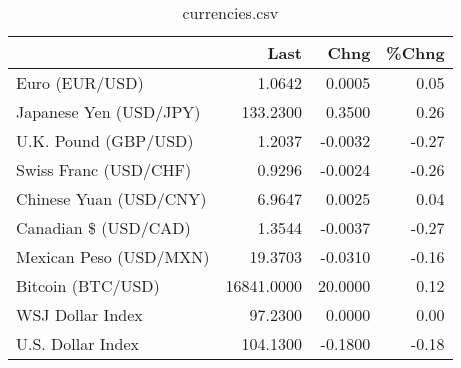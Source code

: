 \documentclass{article}%
\begin{document}
%


\begin{table}[htbp]%
\caption{currencies.csv}%
\centering%
\begin{adjustbox}{width=1\textwidth}%
\begin{tabular}{lrrr}
\toprule
                       &       Last &    Chng &  \%Chng \\
\midrule
        Euro (EUR/USD) &     1.0642 &  0.0005 &   0.05 \\
Japanese Yen (USD/JPY) &   133.2300 &  0.3500 &   0.26 \\
  U.K. Pound (GBP/USD) &     1.2037 & -0.0032 &  -0.27 \\
 Swiss Franc (USD/CHF) &     0.9296 & -0.0024 &  -0.26 \\
Chinese Yuan (USD/CNY) &     6.9647 &  0.0025 &   0.04 \\
  Canadian \$ (USD/CAD) &     1.3544 & -0.0037 &  -0.27 \\
Mexican Peso (USD/MXN) &    19.3703 & -0.0310 &  -0.16 \\
     Bitcoin (BTC/USD) & 16841.0000 & 20.0000 &   0.12 \\
      WSJ Dollar Index &    97.2300 &  0.0000 &   0.00 \\
     U.S. Dollar Index &   104.1300 & -0.1800 &  -0.18 \\
\bottomrule
\end{tabular}
%
\end{adjustbox}%
\end{table}

%
\end{document}
